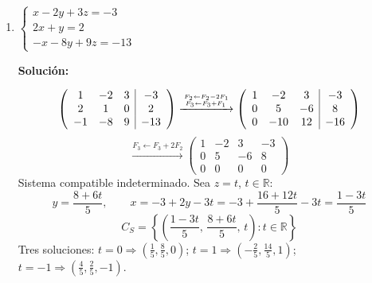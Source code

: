 \documentclass[12pt]{article}
\newcommand{\solucion}{%
    \vspace{0.8em}%
    \textbf{Solución:}%
}
\begin{document}
\begin{enumerate}[label=\alph*.-]
    \solucion
    \[
    \left(\begin{array}{ccc|c}
    -1 & 2 & 0 & 1 \\ 4 & -3 & -5 & 2 \\ 1 & -1 & -1 & 5
    \end{array}\right)
    \xrightarrow{F_1 \leftarrow -F_1}
    \left(\begin{array}{ccc|c}
    1 & -2 & 0 & -1 \\ 4 & -3 & -5 & 2 \\ 1 & -1 & -1 & 5
    \end{array}\right)
    \]
    \[
    \xrightarrow{F_2 \leftarrow F_2 - 4F_1 \atop F_3 \leftarrow F_3 - F_1}
    \left(\begin{array}{ccc|c}
    1 & -2 & 0 & -1 \\ 0 & 5 & -5 & 6 \\ 0 & 1 & -1 & 6
    \end{array}\right)
    \xrightarrow{F_3 \leftarrow 5F_3 - F_2}
    \left(\begin{array}{ccc|c}
    1 & -2 & 0 & -1 \\ 0 & 5 & -5 & 6 \\ 0 & 0 & 0 & 24
    \end{array}\right)
    \]
    La última fila indica $0 = 24$, contradicción.
    \[
    \boxed{\text{El sistema es incompatible (no tiene solución).}}
    \]

    \newpage
    \item $\begin{cases} x - 2y + 3z = -3 \\ 2x + y = 2 \\ -x - 8y + 9z = -13 \end{cases}$

    \solucion
    \[
    \left(\begin{array}{ccc|c}
    1 & -2 & 3 & -3 \\ 2 & 1 & 0 & 2 \\ -1 & -8 & 9 & -13
    \end{array}\right)
    \xrightarrow{F_2 \leftarrow F_2 - 2F_1 \atop F_3 \leftarrow F_3 + F_1}
    \left(\begin{array}{ccc|c}
    1 & -2 & 3 & -3 \\ 0 & 5 & -6 & 8 \\ 0 & -10 & 12 & -16
    \end{array}\right)
    \]
    \[
    \xrightarrow{F_3 \leftarrow F_3 + 2F_2}
    \left(\begin{array}{ccc|c}
    1 & -2 & 3 & -3 \\ 0 & 5 & -6 & 8 \\ 0 & 0 & 0 & 0
    \end{array}\right)
    \]
    Sistema compatible indeterminado. Sea $z = t$, $t\in\mathbb{R}$:
    \[
    y = \frac{8+6t}{5}, \qquad x = -3 + 2y - 3t = -3 + \frac{16+12t}{5} - 3t = \frac{1-3t}{5}
    \]
    \[
    \boxed{C_S = \left\{\left(\frac{1-3t}{5},\,\frac{8+6t}{5},\,t\right) : t \in \mathbb{R}\right\}}
    \]
    Tres soluciones: $t=0 \Rightarrow \left(\frac{1}{5},\frac{8}{5},0\right)$;\quad
    $t=1 \Rightarrow \left(-\frac{2}{5},\frac{14}{5},1\right)$;\quad
    $t=-1 \Rightarrow \left(\frac{4}{5},\frac{2}{5},-1\right)$.


\end{enumerate}
\end{document}
